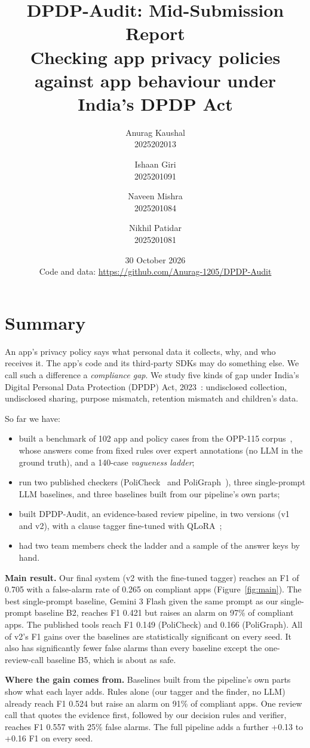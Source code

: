 \documentclass[11pt,a4paper]{article}
\title{DPDP-Audit: Mid-Submission Report\\[2pt]
\large Checking app privacy policies against app behaviour under India's DPDP Act}
\author{Anurag Kaushal\\2025202013 \and Ishaan Giri\\2025201091 \and Naveen Mishra\\2025201084
\and Nikhil Patidar\\2025201081}
\date{30 October 2026\\[2pt]
Code and data: \url{https://github.com/Anurag-1205/DPDP-Audit}}
\begin{document}
\maketitle

\section{Summary}

An app's privacy policy says what personal data it collects, why, and who receives it. The app's
code and its third-party SDKs may do something else. We call such a difference a \emph{compliance
gap}. We study five kinds of gap under India's Digital Personal Data Protection (DPDP) Act,
2023~\cite{dpdpact,dpdprules}: undisclosed collection, undisclosed sharing, purpose mismatch,
retention mismatch and children's data.

So far we have:
\begin{itemize}
  \item built a benchmark of 102 app and policy cases from the OPP-115 corpus~\cite{opp115}, whose
        answers come from fixed rules over expert annotations (no LLM in the ground truth), and a
        140-case \emph{vagueness ladder};
  \item run two published checkers (PoliCheck~\cite{policheck} and PoliGraph~\cite{poligraph}),
        three single-prompt LLM baselines, and three baselines built from our pipeline's own parts;
  \item built DPDP-Audit, an evidence-based review pipeline, in two versions (v1 and v2), with a
        clause tagger fine-tuned with QLoRA~\cite{qlora};
  \item had two team members check the ladder and a sample of the answer keys by hand.
\end{itemize}

\textbf{Main result.} Our final system (v2 with the fine-tuned tagger) reaches an F1 of 0.705 with a
false-alarm rate of 0.265 on compliant apps (Figure~\ref{fig:main}). The best single-prompt baseline,
Gemini 3 Flash given the same prompt as our single-prompt baseline B2, reaches F1 0.421 but raises an
alarm on 97\% of compliant apps. The published tools reach F1 0.149 (PoliCheck) and 0.166
(PoliGraph). All of v2's F1 gains over the baselines are statistically significant on every seed. It
also has significantly fewer false alarms than every baseline except the one-review-call baseline B5,
which is about as safe.

\textbf{Where the gain comes from.} Baselines built from the pipeline's own parts show what each
layer adds. Rules alone (our tagger and the finder, no LLM) already reach F1 0.524 but raise an
alarm on 91\% of compliant apps. One review call that quotes the evidence first, followed by our
decision rules and verifier, reaches F1 0.557 with 25\% false alarms. The full pipeline adds a
further +0.13 to +0.16 F1 on every seed.
\end{document}
